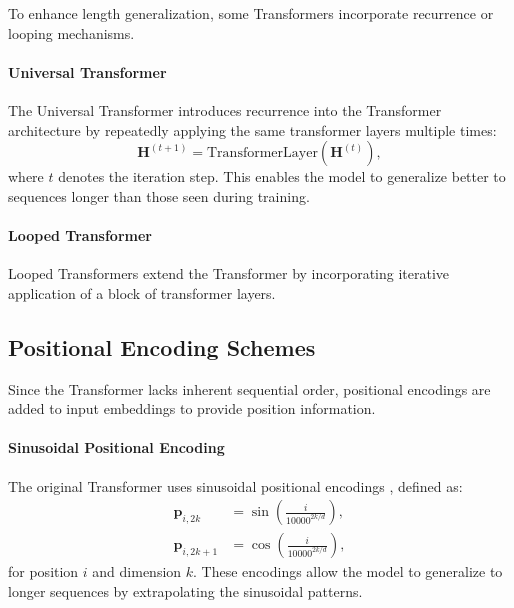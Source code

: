 To enhance length generalization, some Transformers incorporate recurrence or looping mechanisms.

\paragraph{Universal Transformer}

The Universal Transformer \cite{dehghani_universal_2018} introduces recurrence into the Transformer architecture by repeatedly applying the same transformer layers multiple times:
\begin{equation*}
    \mathbf{H}^{(t+1)} = \text{TransformerLayer}(\mathbf{H}^{(t)}),
\end{equation*}
where $t$ denotes the iteration step. This enables the model to generalize better to sequences longer than those seen during training.

\paragraph{Looped Transformer}

Looped Transformers \parencite{yang_looped_2023} extend the Transformer by incorporating iterative application of a block of transformer layers.

\subsection{Positional Encoding Schemes}\label{subsec:positional_encoding}

Since the Transformer lacks inherent sequential order, positional encodings are added to input embeddings to provide position information.

\paragraph{Sinusoidal Positional Encoding}\label{subsec:sinusoidal_pos_enc}

The original Transformer uses sinusoidal positional encodings \cite{vaswani_attention_2017}, defined as:
\begin{align*}
    \mathbf{p}_{i,2k}   & = \sin\left( \frac{i}{10000^{2k/d}} \right), \\
    \mathbf{p}_{i,2k+1} & = \cos\left( \frac{i}{10000^{2k/d}} \right),
\end{align*}
for position $i$ and dimension $k$. These encodings allow the model to generalize to longer sequences by extrapolating the sinusoidal patterns.

